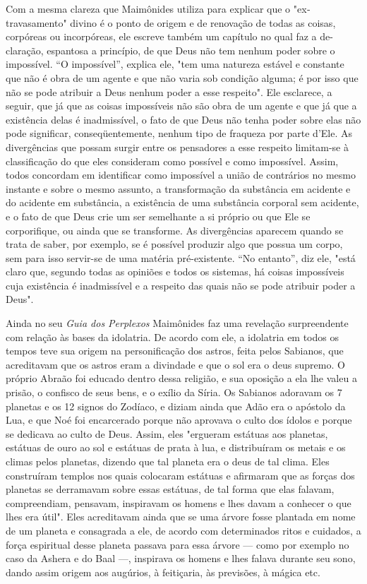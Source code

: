 Com a mesma clareza que Maimônides utiliza para explicar que o
"ex­travasamento" divino é o ponto de origem e de renovação de todas as
coisas, corpóreas ou incorpóreas, ele escreve também um capítulo no qual
faz a de-
claração, espantosa a princípio, de que Deus não tem nenhum poder sobre
o impossível. ``O impossível'', explica ele, "tem uma natureza estável e
constan­te que não é obra de um agente e que não varia sob condição
alguma; é por isso que não se pode atribuir a Deus nenhum poder a esse
respeito". Ele escla­rece, a seguir, que já que as coisas impossíveis
não são obra de um agente e que já que a existência delas é
inadmissível, o fato de que Deus não tenha po­der sobre elas não pode
significar, conseqüentemente, nenhum tipo de fraque­za por parte d'Ele.
As divergências que possam surgir entre os pensadores a es­se respeito
limitam-se à classificação do que eles consideram como possível e como
impossível. Assim, todos concordam em identificar como impossível a
união de contrários no mesmo instante e sobre o mesmo assunto, a
transfor­mação da substância em acidente e do acidente em substância, a
existência de uma substância corporal sem acidente, e o fato de que Deus
crie um ser seme­lhante a si próprio ou que Ele se corporifique, ou
ainda que se transforme. As divergências aparecem quando se trata de
saber, por exemplo, se é possível pro­duzir algo que possua um corpo,
sem para isso servir-se de uma matéria pré-exis­tente. ``No entanto'', diz
ele, "está claro que, segundo todas as opiniões e to­dos os sistemas, há
coisas impossíveis cuja existência é inadmissível e a respei­to das
quais não se pode atribuir poder a Deus".

Ainda no seu \emph{Guia dos Perplexos} Maimônides faz uma revelação
sur­preendente com relação às bases da idolatria. De acordo com ele, a
idolatria em todos os tempos teve sua origem na personificação dos
astros, feita pelos Sabianos, que acreditavam que os astros eram a
divindade e que o sol era o deus supremo. O próprio Abraão foi educado
dentro dessa religião, e sua opo­sição a ela lhe valeu a prisão, o
confisco de seus bens, e o exílio da Síria. Os Sabianos adoravam os 7
planetas e os 12 signos do Zodíaco, e diziam ainda que Adão era o
apóstolo da Lua, e que Noé foi encarcerado porque não aprovava o culto
dos ídolos e porque se dedicava ao culto de Deus. Assim, eles "ergue­ram
estátuas aos planetas, estátuas de ouro ao sol e estátuas de prata à
lua, e distribuíram os metais e os climas pelos planetas, dizendo que
tal planeta era o deus de tal clima. Eles construíram templos nos quais
colocaram estátuas e afirmaram que as forças dos planetas se derramavam
sobre essas estátuas, de tal forma que elas falavam, compreendiam,
pensavam, inspiravam os homens e lhes davam a conhecer o que lhes era
útil". Eles acreditavam ainda que se uma árvore fosse plantada em nome
de um planeta e consagrada a ele, de acor­do com determinados ritos e
cuidados, a força espiritual desse planeta passava para essa árvore ---
como por exemplo no caso da Ashera e do Baal ---, inspira­va os homens e
lhes falava durante seu sono, dando assim origem aos augúrios, à
feitiçaria, às previsões, à mágica etc.

